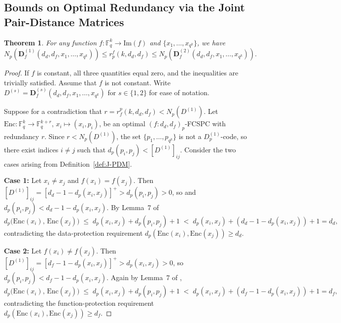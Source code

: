 \documentclass[11pt,draftclsnofoot,journal,onecolumn]{IEEEtran}
\newtheorem{theorem}{Theorem}
\begin{document}
 \subsection{Bounds on Optimal Redundancy via the Joint Pair-Distance Matrices}
    
    \begin{theorem}
    \label{thm:jpdm-sandwich}
        For any function $f : \mathbb{F}_q^k \to \text{Im}(f)$ and $\{x_1, \dots, x_{q^k}\}$, we have 
        \[
        N_p(\boldsymbol{D}_f^{(1)}(d_d, d_f, x_1, \dots, x_{q^k})) \leq r^f_p(k, d_d, d_f) \leq N_p(\boldsymbol{D}_f^{(2)}(d_d,d_f, x_1, \dots, x_{q^k})).
        \]
    \end{theorem}
    \begin{proof}
        If $f$ is constant, all three quantities equal zero, and the inequalities are trivially satisfied.  Assume that $f$ is not constant.  Write $D^{(s)} = \boldsymbol{D}_f^{(s)}(d_d, d_f, x_1, \ldots, x_{q^k})$ for $s \in \{1, 2\}$ for ease of notation.
 
        \noindent
        Suppose for a contradiction that $r = r_f^p(k,d_d,d_f) < N_p(D^{(1)})$. Let $\mathrm{Enc} : \mathbb{F}_q^k \to \mathbb{F}_q^{k+r}$,
        $x_i \mapsto (x_i, p_i)$, be an optimal $(f : d_d, d_f)_p$-FCSPC with redundancy $r$. Since $r < N_p(D^{(1)})$, the set $\{p_1, \ldots, p_{q^k}\}$ is not a $D^{(1)}_p$-code, so there exist indices $i \neq j$ such that $d_p(p_i, p_j) < [D^{(1)}]_{ij}$.
        Consider the two cases arising from Definition~\ref{def:J-PDM}.
 
        \noindent
        \textbf{Case 1:} Let $x_i \neq x_j$ and $f(x_i) = f(x_j)$. Then $[D^{(1)}]_{ij} = [d_d - 1 - d_p(x_i, x_j)]^+ > d_p(p_i, p_j) >0$, so and $d_p(p_i, p_j) < d_d - 1 - d_p(x_i, x_j)$.
        By Lemma~7 of \cite{xia2024function}
        \[
            d_p\!\bigl(\mathrm{Enc}(x_i),\,\mathrm{Enc}(x_j)\bigr)
            \;\leq\;
            d_p(x_i,x_j) + d_p(p_i,p_j) + 1
            \;<\;
            d_p(x_i,x_j) + (d_d - 1 - d_p(x_i,x_j)) + 1
            = d_d,
        \]
        contradicting the data-protection requirement $d_p(\mathrm{Enc}(x_i), \mathrm{Enc}(x_j)) \geq d_d$.

        \noindent
        \textbf{Case 2:} Let $f(x_i) \neq f(x_j)$. Then $[D^{(1)}]_{ij} = [d_f - 1 - d_p(x_i,x_j)]^+ > d_p(x_i,x_j) > 0$, so $d_p(p_i,p_j) < d_f - 1 - d_p(x_i,x_j)$. Again by Lemma~7 of \cite{xia2024function},
        \[
        d_p\!\bigl(\mathrm{Enc}(x_i),\,\mathrm{Enc}(x_j)\bigr)
        \;\leq\;
        d_p(x_i,x_j) + d_p(p_i,p_j) + 1
        \;<\;
        d_p(x_i,x_j) + (d_f - 1 - d_p(x_i,x_j)) + 1
        = d_f,
        \]
        contradicting the function-protection requirement $d_p(\mathrm{Enc}(x_i), \mathrm{Enc}(x_j)) \geq d_f$.
 

\end{proof}
\end{document}
